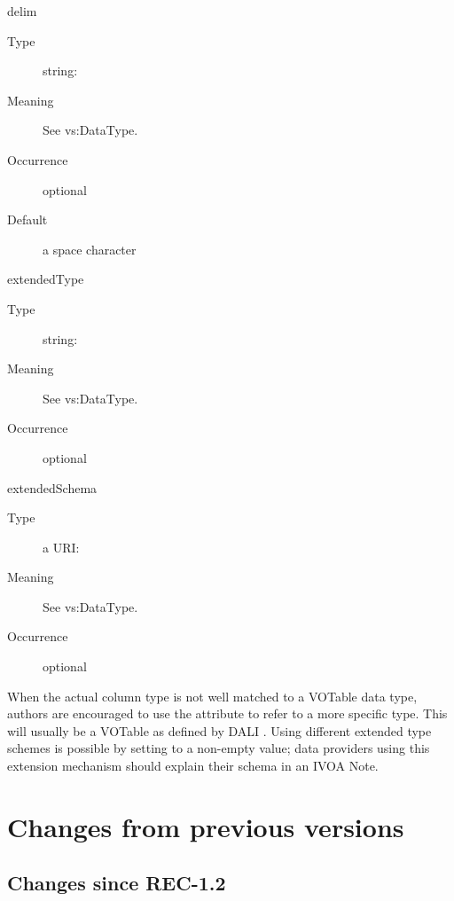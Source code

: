 \documentclass[11pt,a4paper]{ivoa}
\begin{document}
\begin{generated}
\begin{bigdescription}
\begin{description}
\end{description}
\item[delim]
\begin{description}
\item[Type] string: 
\item[Meaning] See vs:DataType.
\item[Occurrence] optional
\item[Default] a space character
\end{description}
\item[extendedType]
\begin{description}
\item[Type] string: 
\item[Meaning] See vs:DataType.
\item[Occurrence] optional
\end{description}
\item[extendedSchema]
\begin{description}
\item[Type] a URI: 
\item[Meaning] See vs:DataType.
\item[Occurrence] optional
\end{description}


\end{bigdescription}\endgroup

\endgroup
\end{generated}




When the actual column type is not
well matched to a VOTable data type, authors are
encouraged to use the  attribute to refer to
a more specific type.  This will usually be a VOTable  as
defined by DALI \citep{2017ivoa.spec.0517D}.  Using different extended
type schemes is possible by setting  to a
non-empty value; data providers using this extension mechanism should
explain their schema in an IVOA Note.

\appendix

\section{Changes from previous versions}

\subsection{Changes since REC-1.2}
\end{document}
